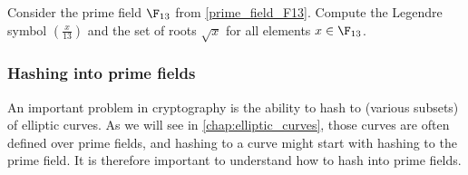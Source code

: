 \begin{exercise}
Consider the prime field $\F_{13}$ from \exercisename{} \ref{prime_field_F13}. Compute the Legendre symbol $\left(\frac{x}{13} \right)$ and the set of roots $\sqrt{x}$ for all elements $x\in \F_{13}$. 
\end{exercise}
%

\subsubsection{Hashing into prime fields}\label{hashing-prime-fields}
An important problem in cryptography is the ability to hash to (various subsets) of elliptic curves. As we will see in \chaptname{} \ref{chap:elliptic_curves}, those curves are often defined over prime fields, and hashing to a curve might start with hashing to the prime field. It is therefore important to understand how to hash into prime fields.


